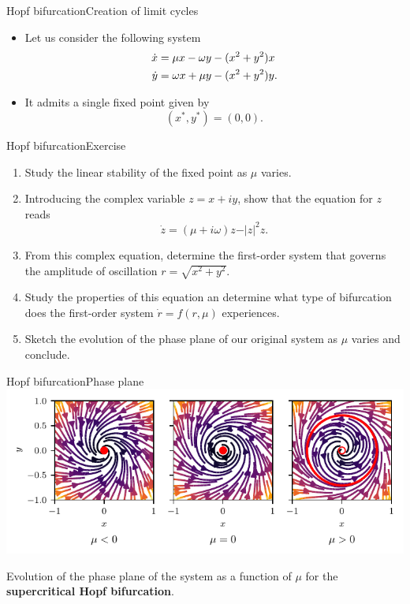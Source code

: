 \documentclass[usenames,dvipsnames,svgnames,10pt,aspectratio=169]{beamer}
\begin{document}
\begin{frame}[t, c]{Hopf bifurcation}{Creation of limit cycles}
	\begin{itemize}
		\item Let us consider the following system
		\begin{equation}
			\begin{aligned}
				\dot{x} & = \mu x - \omega y - (x^2 + y^2)x \\
				\dot{y} & = \omega x + \mu y - (x^2 + y^2)y.
			\end{aligned}
			\notag
		\end{equation}

		\medskip

		\item It admits a single fixed point given by
		$$(x^*, y^*) = (0, 0).$$
	\end{itemize}

	\vspace{1cm}
\end{frame}

\begin{frame}[t, c]{Hopf bifurcation}{Exercise}
	\begin{enumerate}
		\item Study the linear stability of the fixed point as $\mu$ varies.
		\item Introducing the complex variable $z = x + iy$, show that the equation for $z$ reads
		$$\dot{z} = (\mu + i\omega)z - \vert z \vert^2z.$$
		\item From this complex equation, determine the first-order system that governs the amplitude of oscillation $r = \sqrt{x^2 + y^2}$.
		\item Study the properties of this equation an determine what type of bifurcation does the first-order system $\dot{r} = f(r, \mu)$ experiences.
		\item Sketch the evolution of the phase plane of our original system as $\mu$ varies and conclude.
	\end{enumerate}

	\vspace{1cm}
\end{frame}

\begin{frame}[t, c]{Hopf bifurcation}{Phase plane}
	\centering
	\includegraphics[width=.75\textwidth]{supercritical_hopf_bifurcation_phase_plane}

	Evolution of the phase plane of the system as a function of $\mu$ for the \alert{\textbf{supercritical Hopf bifurcation}}.

	\vspace{1cm}
\end{frame}
\end{document}

